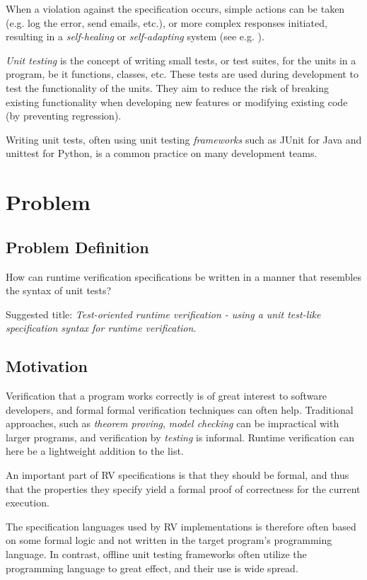 \documentclass[a4paper,11pt]{article}
\begin{document}
When a violation against the specification occurs, simple actions can be taken (e.g. log the error, send emails, etc.), or more complex responses initiated, resulting in a \textit{self-healing} or \textit{self-adapting} system (see e.g. \cite{huebscher08}).

\textit{Unit testing} is the concept of writing small tests, or test suites, for the units in a program, be it functions, classes, etc. These tests are used during development to test the functionality of the units. They aim to reduce the risk of breaking existing functionality when developing new features or modifying existing code (by preventing regression).

Writing unit tests, often using unit testing \textit{frameworks} such as JUnit \cite{junit} for Java and unittest \cite{python-unittest} for Python, is a common practice on many development teams.

\section{Problem}

\subsection{Problem Definition}

How can runtime verification specifications be written in a manner that resembles
the syntax of unit tests?

Suggested title: \textit{Test-oriented runtime verification - using a unit test-like specification syntax for runtime verification}.


\subsection{Motivation}

Verification that a program works correctly is of great interest to software developers, and
formal formal verification techniques can often help. Traditional approaches, such as
\textit{theorem proving}, \textit{model checking} can be impractical with larger programs,
and verification by \textit{testing} is informal. Runtime verification can here be a lightweight
addition to the list.

An important part of RV specifications is that they should be formal, and thus
that the properties they specify yield a formal proof of correctness for the
current execution.

The specification languages used by RV implementations is therefore often based
on some formal logic and not written in the target program's programming language. In contrast,
offline unit testing frameworks often utilize the programming language to great effect,
and their use is wide spread.
\end{document}
